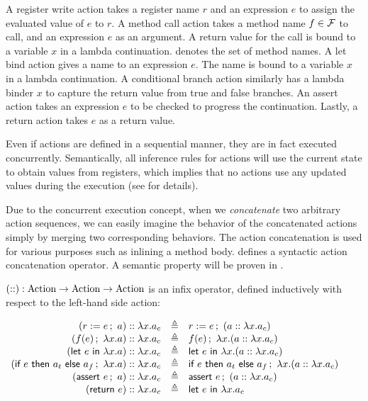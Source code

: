 A register write action takes a register name $r$ and an expression
$e$ to assign the evaluated value of $e$ to $r$. A method call action
takes a method name $f \in \setmeths{}$ to call, and an expression $e$
as an argument. A return value for the call is bound to a variable $x$
in a lambda continuation. \setmeths{} denotes the set of method
names. A let bind action gives a name to an expression $e$. The name
is bound to a variable $x$ in a lambda continuation. A conditional
branch action similarly has a lambda binder $x$ to capture the return
value from true and false branches. An assert action takes an
expression $e$ to be checked to progress the continuation. Lastly, a
return action takes $e$ as a return value.

Even if actions are defined in a sequential manner, they are in fact
executed concurrently. Semantically, all inference rules for actions
will use the current state to obtain values from registers, which implies
that no actions use any updated values during the execution (see
 for details).

Due to the concurrent execution concept, when we \emph{concatenate}
two arbitrary action sequences, we can easily imagine the behavior of
the concatenated actions simply by merging two corresponding
behaviors. The action concatenation is used for various purposes such
as inlining a method body.  defines a
syntactic action concatenation operator. A semantic property will be
proven in .

\begin{definition}
  \label{def-concataction}
  $(\concatsymb) : \textrm{Action} \to \textrm{Action} \to
  \textrm{Action}$ is an infix operator, defined inductively with
  respect to the left-hand side action:
  \begin{center}
    \begin{math}
      \begin{array}{rcl}
        \concataction{(\actwrite{r}{e}{a})}{a_c} & \triangleq & \actwrite{r}{e}{(\concataction{a}{a_c})} \\
        \concataction{(\actcall{x}{f}{e}{a})}{a_c} & \triangleq & \actcall{x}{f}{e}{(\concataction{a}{a_c})} \\
        \concataction{(\actlet{e}{x}{a})}{a_c} & \triangleq & \actlet{e}{x}{(\concataction{a}{a_c})} \\
        \concataction{(\actifelse{e}{a_t}{a_f}{x}{a})}{a_c} & \triangleq &
        \actifelse{e}{a_t}{a_f}{x}{(\concataction{a}{a_c})} \\
        \concataction{(\actassert{e}{a})}{a_c} & \triangleq & \actassert{e}{(\concataction{a}{a_c})} \\
        \concataction{(\actret{e})}{a_c} & \triangleq & \actlet{e}{x}{a_c} \\
      \end{array}
    \end{math}
  \end{center}
\end{definition}

